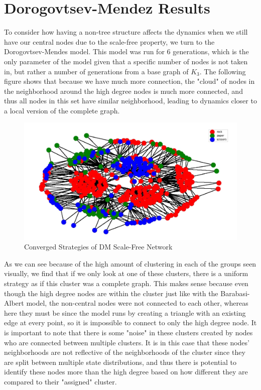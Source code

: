 \documentclass[letterpaper, 12 pt, conference]{ieeeconf}
\begin{document}
\section*{Dorogovtsev-Mendez Results}
To consider how having a non-tree structure affects the dynamics when we still have our central nodes due to the scale-free property, we turn to the Dorogovtsev-Mendes model. This model was run for 6 generations, which is the only parameter of the model given that a specific number of nodes is not taken in, but rather a number of generations from a base graph of $K_3$. The following figure shows that because we have much more connection, the "cloud" of nodes in the neighborhood around the high degree nodes is much more connected, and thus all nodes in this set have similar neighborhood, leading to dynamics closer to a local version of the complete graph. 
\begin{figure}[ht]
    \centering
    \includegraphics[width=\columnwidth]{dm.png}
    \caption{Converged Strategies of DM Scale-Free Network}
    \label{fig:dm net}
\end{figure}
As we can see because of the high amount of clustering in each of the groups seen visually, we find that if we only look at one of these clusters, there is a uniform strategy as if this cluster was a complete graph. This makes sense because even though the high degree nodes are within the cluster just like with the Barabasi-Albert model, the non-central nodes were not connected to each other, whereas here they must be since the model runs by creating a triangle with an existing edge at every point, so it is impossible to connect to only the high degree node. It is important to note that there is some "noise" in these clusters created by nodes who are connected between multiple clusters. It is in this case that these nodes' neighborhoods are not reflective of the neighborhoods of the cluster since they are split between multiple state distributions, and thus there is potential to identify these nodes more than the high degree based on how different they are compared to their "assigned" cluster. 
\end{document}

